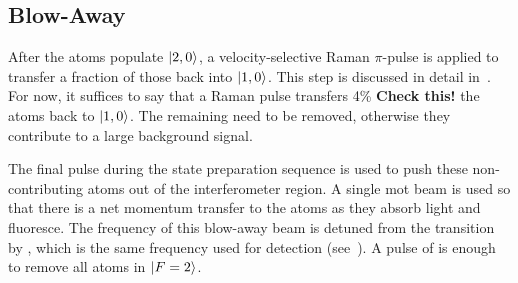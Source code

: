 \subsection{Blow-Away}\label{subsec:blow_away}
After the atoms populate \(\ket{2,0}\), a velocity-selective Raman \(\pi\)-pulse is applied to transfer a fraction of those back into \(\ket{1,0}\). This step is discussed in detail in~. For now, it suffices to say that a Raman pulse transfers 4\% \textbf{Check this!} the atoms back to \(\ket{1,0}\). The remaining need to be removed, otherwise they contribute to a large background signal. \par\noindent
The final pulse during the state preparation sequence is used to push these non-contributing atoms out of the interferometer region. A single \ac{mot} beam is used so that there is a net momentum transfer to the atoms as they absorb light and fluoresce. The frequency of this blow-away beam is detuned from the  transition by , which is the same frequency used for detection (see~). A pulse of  is enough to remove all atoms in \(\ket{F=2}\). 


